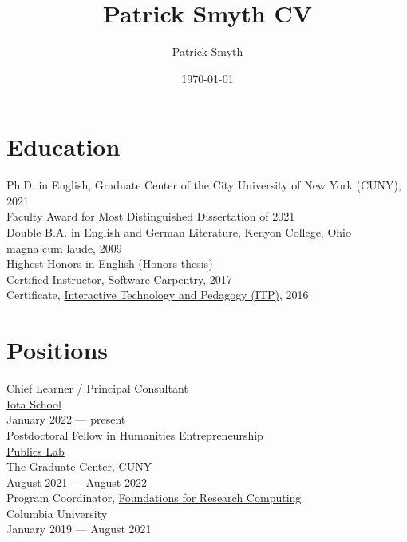 \documentclass[11pt]{article}
\author{Patrick Smyth}
\date{\today}
\title{Patrick Smyth CV}
\begin{document}
\maketitle

\section*{Education}
\label{sec:orgheadline1}
Ph.D. in English, Graduate Center of the City University of New York (CUNY), 2021\\
    Faculty Award for Most Distinguished Dissertation of 2021\\



Double B.A. in English and German Literature, Kenyon College, Ohio\\
        magna cum laude, 2009\\
        Highest Honors in English (Honors thesis)\\

Certified Instructor, \href{https://software-carpentry.org/about/}{Software Carpentry}, 2017\\

Certificate, \href{https://www.gc.cuny.edu/Page-Elements/Academics-Research-Centers-Initiatives/Certificate-Programs/Interactive-Technology-and-Pedagogy}{Interactive Technology and Pedagogy (ITP)}, 2016\\

\section*{Positions}
\label{sec:orgheadline2}

Chief Learner / Principal Consultant\\
\href{https://iotaschool.com/\%0A}{Iota School}\\
January 2022 — present\\

Postdoctoral Fellow in Humanities Entrepreneurship\\
\href{https://publicslab.gc.cuny.edu/\%0A}{Publics Lab}\\
The Graduate Center, CUNY\\
August 2021 — August 2022\\

Program Coordinator, \href{https://rcfoundations.research.columbia.edu/}{Foundations for Research Computing}\\
Columbia University\\
January 2019 — August 2021\\
\end{document}

